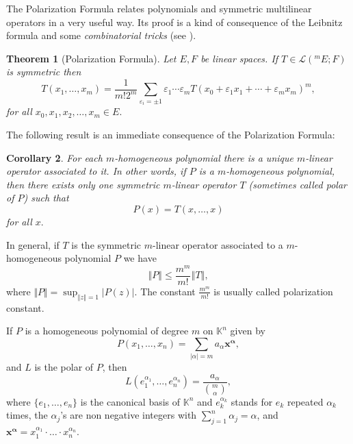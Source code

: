 \documentclass[10pt]{amsart}
\newtheorem{theorem}{Theorem}[section]
\newtheorem{corollary}[theorem]{Corollary}
\numberwithin{equation}{section}
\begin{document}
The Polarization Formula relates polynomials and symmetric multilinear
operators in a very useful way. Its proof is a kind of consequence of the
Leibnitz formula and some \emph{combinatorial tricks} (see \cite{dineen,
mujica}).

\begin{theorem}[Polarization Formula]
\label{FPFEV}Let $E,F$ be linear spaces. If $T\in \mathcal{L}(^{m}E;F)$ is
symmetric then\begin{equation*}
T(x_{1}, \ldots ,x_{m})=\frac{1}{m!2^{m}}\underset{\varepsilon _{i}=\pm 1}{\sum }\varepsilon _{1}\cdots \varepsilon _{m}T(x_{0}+\varepsilon
_{1}x_{1}+\cdots +\varepsilon _{m}x_{m})^{m},
\end{equation*}for all $x_{0},x_{1},x_{2}, \ldots ,x_{m}\in E.$
\end{theorem}

The following result is an immediate consequence of the Polarization Formula:

\begin{corollary}
\label{corpf}For each $m$-homogeneous polynomial there is a unique $m$-linear operator associated to it. In other words, if $P$ is a $m$-homogeneous polynomial, then there exists only one symmetric $m$-linear
operator $T$ (sometimes called \textit{polar} of $P$) such that
\begin{equation*}
P(x)=T(x, \ldots ,x)
\end{equation*}
for all $x.$
\end{corollary}

In general, if $T$ is the symmetric $m$-linear operator associated to a $m$-homogeneous polynomial $P$ we have\begin{equation}
\left\Vert P\right\Vert \leq \frac{m^{m}}{m!}\left\Vert T\right\Vert,
\label{polar}
\end{equation}
where $\Vert P\Vert=\sup_{\left\Vert z\right\Vert =1}|P(z)|$. The constant $\frac{m^m}{m!}$ is usually called polarization constant.

If $P$ is a homogeneous polynomial of degree $m$ on ${\mathbb{K}}^{n}$ given
by
\begin{equation*}
P(x_{1},\ldots ,x_{n})=\sum_{|\alpha |=m}a_{\alpha }\mathbf{{x}^{\alpha },}
\end{equation*}and $L$ is the polar of $P$, then
\begin{equation}
L(e_{1}^{\alpha _{1}},\ldots ,e_{n}^{\alpha _{n}})=\frac{a_{\alpha }}{\binom{m}{\alpha }},  \label{800}
\end{equation}where $\{e_{1},\ldots ,e_{n}\}$ is the canonical basis of ${\mathbb{K}}^{n}$
and $e_{k}^{\alpha_{k}}$ stands for $e_{k}$ repeated $\alpha_{k}$ times, the
$\alpha_j$'s are non negative integers with $\sum_{j=1}^{n} \alpha_j = \alpha
$, and $\mathbf{{x}^{\alpha}} = x_{1}^{\alpha_1} \cdot \ldots \cdot
x_{n}^{\alpha_n}$.
\end{document}
